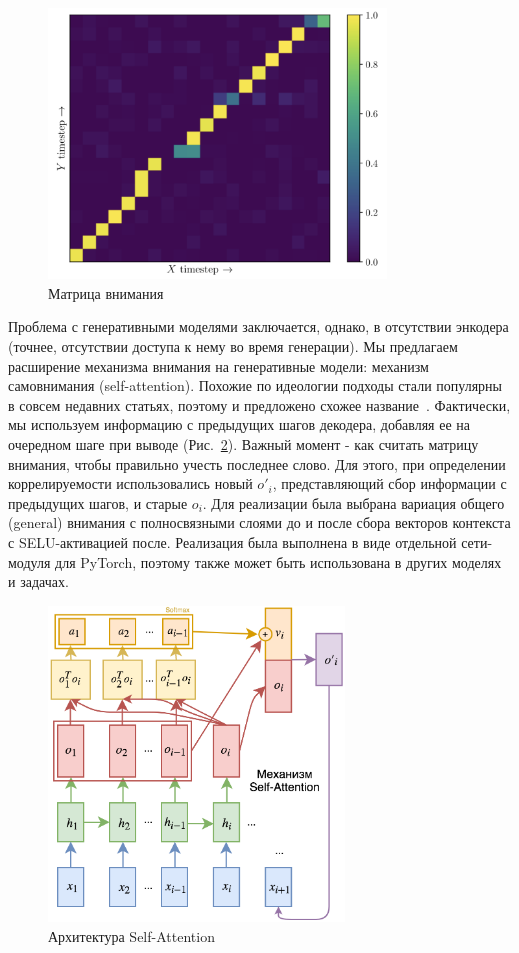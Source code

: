 \documentclass{spbau-diploma}
\begin{document}
\begin{figure}[H]
\centering
\includegraphics[width=0.8\textwidth]{images/attention.png}
\caption{Матрица внимания}
\label{attention}
\end{figure}

Проблема с генеративными моделями заключается, однако, в отсутствии энкодера 
(точнее, отсутствии доступа к нему во время генерации). Мы предлагаем 
расширение механизма внимания на генеративные модели: механизм 
самовнимания (self-attention). Похожие по идеологии подходы стали популярны в 
совсем недавних статьях, поэтому и предложено схожее 
название~\cite{1706.03762, 1805.08318}. Фактически, мы используем 
информацию с предыдущих шагов декодера, добавляя ее на очередном шаге при 
выводе (Рис.~\ref{self_attention}). Важный момент - как считать матрицу 
внимания, чтобы правильно учесть последнее слово. Для этого, при определении 
коррелируемости использовались новый $o'_i$, представляющий сбор информации с 
предыдущих шагов, и старые $o_i$. Для реализации 
была выбрана вариация общего (general) внимания с полносвязными слоями до и 
после сбора векторов контекста с SELU-активацией после. Реализация была 
выполнена в виде отдельной сети-модуля для PyTorch, поэтому также может быть
использована в других моделях и задачах.

\begin{figure}[H]
\centering
\includegraphics[width=0.7\textwidth]{images/self_attention.png}
\caption{Архитектура Self-Attention}
\label{self_attention}
\end{figure}
\end{document}
